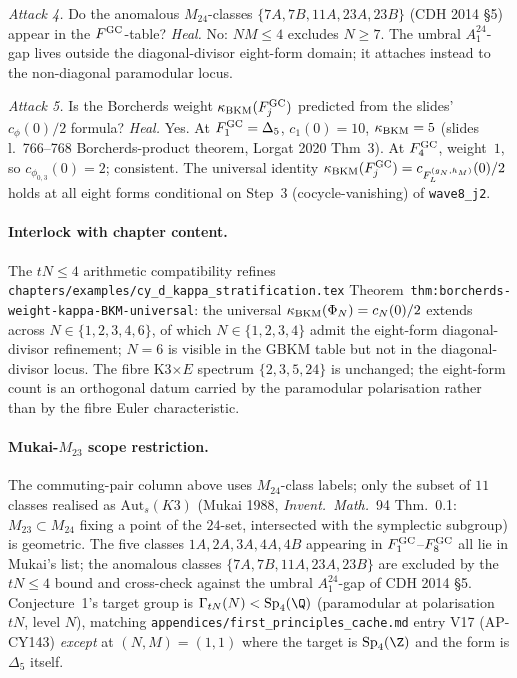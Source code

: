 \emph{Attack 4.}  Do the anomalous $M_{24}$-classes
$\{7A,7B,11A,23A,23B\}$ (CDH 2014 \S 5) appear in the
$F^{\mathrm{GC}}_{}$-table?  \emph{Heal.}  No: $NM\leq 4$ excludes
$N\geq 7$.  The umbral $A_1^{24}$-gap lives outside the
diagonal-divisor eight-form domain; it attaches instead to the
non-diagonal paramodular locus.

\emph{Attack 5.}  Is the Borcherds weight $\kappa_{\mathrm{BKM}}(F^{\mathrm{GC}}_{j})$
predicted from the slides' $c_{\phi}(0)/2$ formula?  \emph{Heal.}
Yes.  At $F^{\mathrm{GC}}_{1}=\Delta_5$, $c_1(0)=10$, $\kappa_{\mathrm{BKM}}=5$
(slides l.~766--768 Borcherds-product theorem, Lorgat 2020 Thm~3).
At $F^{\mathrm{GC}}_{4}$, weight~$1$, so $c_{\phi_{0,3}}(0)=2$; consistent.
The universal identity $\kappa_{\mathrm{BKM}}(F^{\mathrm{GC}}_{j})
=c_{F^{(g_N,h_M)}_L}(0)/2$ holds at all eight forms conditional on
Step~3 (cocycle-vanishing) of \texttt{wave8\_j2}.

\paragraph{Interlock with chapter content.}
The $tN\leq 4$ arithmetic compatibility refines
\texttt{chapters/examples/cy\_d\_kappa\_stratification.tex}
Theorem~\texttt{thm:borcherds-weight-kappa-BKM-universal}: the
universal $\kappa_{\mathrm{BKM}}(\Phi_N)=c_N(0)/2$ extends across
$N\in\{1,2,3,4,6\}$, of which $N\in\{1,2,3,4\}$ admit the
eight-form diagonal-divisor refinement; $N=6$ is visible in the
GBKM table but not in the diagonal-divisor locus.  The fibre
K3$\times E$ spectrum $\{2,3,5,24\}$ is unchanged; the eight-form
count is an orthogonal datum carried by the paramodular polarisation
rather than by the fibre Euler characteristic.

\paragraph{Mukai-$M_{23}$ scope restriction.}
The commuting-pair column above uses $M_{24}$-class labels; only the
subset of $11$ classes realised as $\mathrm{Aut}_s(K3)$ (Mukai 1988,
\emph{Invent.~Math.}~94 Thm.~0.1: $M_{23}\subset M_{24}$ fixing a
point of the $24$-set, intersected with the symplectic subgroup) is
geometric.  The five classes $1A, 2A, 3A, 4A, 4B$ appearing in
$F^{\mathrm{GC}}_{1}$--$F^{\mathrm{GC}}_{8}$ all lie in Mukai's list; the anomalous
classes $\{7A,7B,11A,23A,23B\}$ are excluded by the $tN\leq 4$ bound
and cross-check against the umbral $A_1^{24}$-gap of CDH 2014 \S 5.
Conjecture~1's target group is $\Paramod{tN}(N)<\mathrm{Sp}_4(\Q)$
(paramodular at polarisation $tN$, level $N$), matching
\texttt{appendices/first\_principles\_cache.md} entry V17 (AP-CY143)
\emph{except} at $(N,M)=(1,1)$ where the target is
$\mathrm{Sp}_4(\Z)$ and the form is $\Delta_5$ itself.
